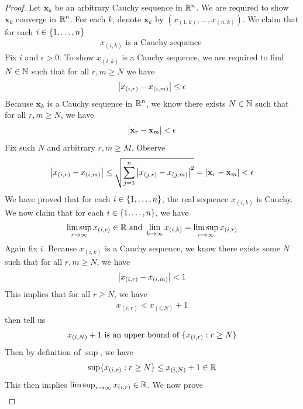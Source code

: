 \documentclass{report}
\begin{document}
\begin{proof}
Let $\textbf{x}_k$ be an arbitrary Cauchy sequence in $\mathbb{R}^n$. We are required to show  $\textbf{x}_k$ converge in $\mathbb{R}^n$. For each $k$, denote  $\textbf{x}_k$ by $(x_{(1,k)},\dots ,x_{(n,k)})$. We claim that for each $i \in \{ 1,\dots ,n \}$
\begin{align*}
x_{(i,k)}\text{ is a Cauchy sequence }
\end{align*}
Fix $i$ and $\epsilon >0$. To show $x_{(i,k)}$ is a Cauchy sequence, we are required to find $N\in\mathbb{N}$ such that for all $r,m\geq N$ we have 
\begin{align*}
\left|x_{(i,r)}-x_{(i,m)}\right|\leq \epsilon 
\end{align*}
Because $\textbf{x}_k$ is a Cauchy sequence in $\mathbb{R}^n$, we know there exists  $N\in\mathbb{N}$ such that for all $r,m\geq N$, we have 
\begin{align*}
\left|\textbf{x}_r-\textbf{x}_m\right|< \epsilon 
\end{align*}
Fix such $N$ and arbitrary $r,m\geq M$. Observe 
\begin{align*}
\left|x_{(i,r)}-x_{(i,m)}\right|\leq \sqrt{\sum_{j=1}^n \left|x_{(j,r)}-x_{(j,m)}\right|^2}= \left|\textbf{x}_r - \textbf{x}_m\right|< \epsilon 
\end{align*}
We have proved that for each $i\in \{ 1,\dots ,n \}$, the real sequence $x_{(i,k)}$ is Cauchy. We now claim that for each $i \in \{ 1,\dots, n \}$, we have 
\begin{align*}
  \limsup_{r\to\infty} x_{(i,r)}\in\mathbb{R} \text{ and }\lim_{k\to \infty}x_{(i,k)}= \limsup_{r\to\infty} x_{(i,r)}
\end{align*}
Again fix $i$. Because $x_{(i,k)}$ is a Cauchy sequence, we know there exists some $N$ such that for all $r,m\geq N$, we have 
 \begin{align*}
\left|x_{(i,r)}-x_{(i,m)}\right|<1
\end{align*}
This implies that for all $r\geq N$, we have 
\begin{align}
x_{(i,r)}< x_{(i,N)}+1 \label{ran1}
\end{align}
 then tell us 
\begin{align*}
x_{(i,N)}+1\text{ is an upper bound of }\{ x_{(i,r)}:r\geq N \}
\end{align*}
Then by definition of $\sup $, we have
\begin{align*}
\sup \{ x_{(i,r)}:r\geq N \} \leq x_{(i,N)}+1 \in\mathbb{R}
\end{align*}
This then implies $\limsup_{r\to\infty} x_{(i,r)}\in\mathbb{R}$. We now prove 
\begin{align}

\end{align}
\end{proof}
\end{document}
